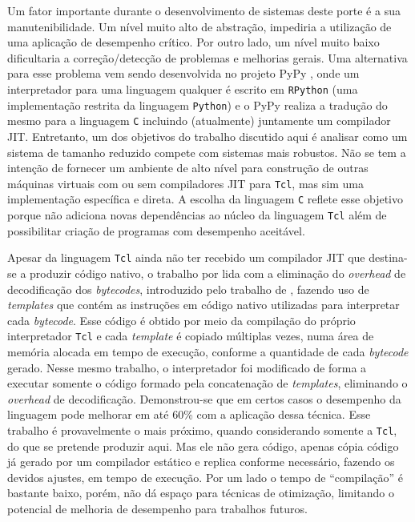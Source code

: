 Um fator importante durante o desenvolvimento de sistemas deste porte
é a sua manutenibilidade. Um nível muito alto de abstração,
impediria a utilização de uma aplicação de desempenho crítico.
Por outro lado, um nível muito baixo dificultaria a correção/detecção de
problemas e melhorias gerais.
Uma alternativa para esse problema vem sendo desenvolvida no
projeto PyPy \cite{pypy}, onde um interpretador para uma linguagem
qualquer é escrito em \texttt{RPython} \cite{rpython} (uma implementação
restrita da linguagem \texttt{Python}) e o PyPy realiza a tradução do
mesmo para a
linguagem \texttt{C} incluindo (atualmente) juntamente um compilador
JIT. Entretanto, um
dos objetivos do trabalho discutido aqui é analisar como um sistema de
tamanho reduzido compete com sistemas mais robustos. Não se tem a
intenção de fornecer um ambiente de alto nível para construção de
outras máquinas virtuais com ou sem compiladores JIT para
\texttt{Tcl}, mas sim uma implementação específica e direta.
A escolha da
linguagem \texttt{C} reflete esse objetivo porque não adiciona novas
dependências ao núcleo da linguagem \texttt{Tcl} além de possibilitar
criação de programas com desempenho aceitável.

Apesar da linguagem \texttt{Tcl} ainda não ter recebido um compilador
JIT que destina-se a produzir código nativo, o trabalho por
 lida
com a eliminação do \textit{overhead} de decodificação dos
\textit{bytecodes}, introduzido pelo trabalho de ,
fazendo uso de \textit{templates} que contém as instruções em
código nativo utilizadas para interpretar cada \textit{bytecode}.
Esse código é
obtido por meio da compilação do próprio interpretador
\texttt{Tcl} e cada \textit{template} é copiado múltiplas vezes,
numa área de memória alocada em tempo de execução, conforme a quantidade de
cada \textit{bytecode} gerado. Nesse mesmo trabalho, o interpretador foi
modificado de forma a executar somente o código formado pela
concatenação de \textit{templates}, eliminando o \textit{overhead} de
decodificação. Demonstrou-se que em certos casos o desempenho da
linguagem pode melhorar em até 60\% com a aplicação dessa técnica.
Esse trabalho é provavelmente o mais próximo, quando considerando
somente a \texttt{Tcl}, do que se pretende produzir aqui.
Mas ele não gera código, apenas cópia código já gerado por um compilador
estático e replica conforme necessário, fazendo os devidos
ajustes, em tempo de execução. Por um lado o tempo de ``compilação'' é
bastante baixo, porém, não dá espaço para técnicas de otimização,
limitando o potencial de melhoria de desempenho para trabalhos futuros.

